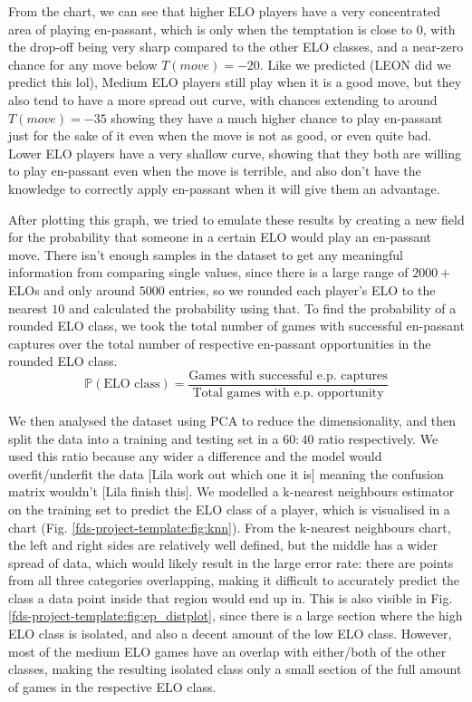 \documentclass[10pt,a4paper,twocolumn]{article}
\begin{document}
From the chart, we can see that higher ELO players have a very concentrated area of playing en-passant, which is only when the temptation is close to $0$, with the drop-off being very sharp compared to the other ELO classes, and a near-zero chance for any move below $T(move)=-20$. Like we predicted (LEON did we predict this lol), Medium ELO players still play when it is a good move, but they also tend to have a more spread out curve, with chances extending to around $T(move) = -35$ showing they have a much higher chance to play en-passant just for the sake of it even when the move is not as good, or even quite bad. Lower ELO players have a very shallow curve, showing that they both are willing to play en-passant even when the move is terrible, and also don't have the knowledge to correctly apply en-passant when it will give them an advantage. \newline

After plotting this graph, we tried to emulate these results by creating a new field for the probability that someone in a certain ELO would play an en-passant move. There isn't enough samples in the dataset to get any meaningful information from comparing single values, since there is a large range of $2000+$ ELOs and only around $5000$ entries, so we rounded each player's ELO to the nearest $10$ and calculated the probability using that. To find the probability of a rounded ELO class, we took the total number of games with successful en-passant captures over the total number of respective en-passant opportunities in the rounded ELO class.
$$\mathbb{P}(\text{ELO class}) = \frac{\text{Games with successful e.p. captures}}{\text{Total games with e.p. opportunity}}$$

We then analysed the dataset using PCA to reduce the dimensionality, and then split the data into a training and testing set in a $60:40$ ratio respectively. We used this ratio because any wider a difference and the model would overfit/underfit the data [Lila work out which one it is] meaning the confusion matrix wouldn't [Lila finish this]. We modelled a k-nearest neighbours estimator on the training set to predict the ELO class of a player, which is visualised in a chart (Fig. \ref{fds-project-template:fig:knn}). From the k-nearest neighbours chart, the left and right sides are relatively well defined, but the middle has a wider spread of data, which would likely result in the large error rate: there are points from all three categories overlapping, making it difficult to accurately predict the class a data point inside that region would end up in. This is also visible in Fig. \ref{fds-project-template:fig:ep_distplot}, since there is a large section where the high ELO class is isolated, and also a decent amount of the low ELO class. However, most of the medium ELO games have an overlap with either/both of the other classes, making the resulting isolated class only 
a small section of the full amount of games in the respective ELO class.\newline
\end{document}
